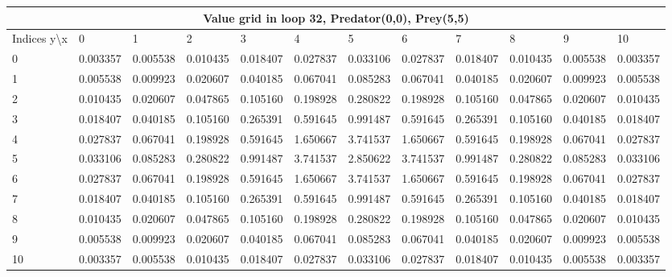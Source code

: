 \documentclass{article}
\begin{document}
\begin{center}
\scalebox{0.7}
	{
	\begin{tabular}{ |l | l | l | l | l | l | l | l | l | l | l | l|}
	\hline
	\multicolumn{12}{|c|}{Value grid in loop 32, Predator(0,0), Prey(5,5)}\\
	\hline
	Indices y\textbackslash x &0 & 1 & 2 & 3 & 4 & 5 & 6 & 7 & 8 & 9 & 10 \\ 

\hline
0 & \cellcolor{green!40}0.003357 & 0.005538 & 0.010435 & 0.018407 & 0.027837 & 0.033106 & 0.027837 & 0.018407 & 0.010435 & 0.005538 & 0.003357 \\
1 & 0.005538 & 0.009923 & 0.020607 & 0.040185 & 0.067041 & 0.085283 & 0.067041 & 0.040185 & 0.020607 & 0.009923 & 0.005538 \\
2 & 0.010435 & 0.020607 & 0.047865 & 0.105160 & 0.198928 & 0.280822 & 0.198928 & 0.105160 & 0.047865 & 0.020607 & 0.010435 \\
3 & 0.018407 & 0.040185 & 0.105160 & 0.265391 & 0.591645 & 0.991487 & 0.591645 & 0.265391 & 0.105160 & 0.040185 & 0.018407 \\
4 & 0.027837 & 0.067041 & 0.198928 & 0.591645 & 1.650667 & 3.741537 & 1.650667 & 0.591645 & 0.198928 & 0.067041 & 0.027837 \\
5 & 0.033106 & 0.085283 & 0.280822 & 0.991487 & 3.741537 & \cellcolor{red!40}2.850622 & 3.741537 & 0.991487 & 0.280822 & 0.085283 & 0.033106 \\
6 & 0.027837 & 0.067041 & 0.198928 & 0.591645 & 1.650667 & 3.741537 & 1.650667 & 0.591645 & 0.198928 & 0.067041 & 0.027837 \\
7 & 0.018407 & 0.040185 & 0.105160 & 0.265391 & 0.591645 & 0.991487 & 0.591645 & 0.265391 & 0.105160 & 0.040185 & 0.018407 \\
8 & 0.010435 & 0.020607 & 0.047865 & 0.105160 & 0.198928 & 0.280822 & 0.198928 & 0.105160 & 0.047865 & 0.020607 & 0.010435 \\
9 & 0.005538 & 0.009923 & 0.020607 & 0.040185 & 0.067041 & 0.085283 & 0.067041 & 0.040185 & 0.020607 & 0.009923 & 0.005538 \\
10 & 0.003357 & 0.005538 & 0.010435 & 0.018407 & 0.027837 & 0.033106 & 0.027837 & 0.018407 & 0.010435 & 0.005538 & 0.003357 \\
\hline
	\end{tabular}
	}
\end{center}
\end{document}
